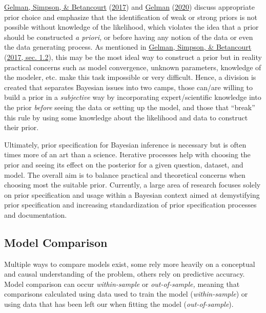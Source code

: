 \documentclass[12pt,twoside]{reedthesis}
\begin{document}
\protect\hyperlink{ref-gelmanPriorCanOften2017}{Gelman, Simpson, \& Betancourt} (\protect\hyperlink{ref-gelmanPriorCanOften2017}{2017}) and \protect\hyperlink{ref-gelmanPriorChoiceRecommendations2020}{Gelman} (\protect\hyperlink{ref-gelmanPriorChoiceRecommendations2020}{2020}) discuss appropriate prior choice and emphasize that the identification of weak or strong priors is not possible without knowledge of the likelihood, which violates the idea that a prior should be constructed \emph{a priori,} or before having any notion of the data or even the data generating process. As mentioned in \protect\hyperlink{ref-gelmanPriorCanOften2017}{Gelman, Simpson, \& Betancourt} (\protect\hyperlink{ref-gelmanPriorCanOften2017}{2017, sec. 1.2}), this may be the most ideal way to construct a prior but in reality practical concerns such as model convergence, unknown parameters, knowledge of the modeler, etc. make this task impossible or very difficult. Hence, a division is created that separates Bayesian issues into two camps, those can/are willing to build a prior in a \emph{subjective} way by incorporating expert/scientific knowledge into the prior \emph{before} seeing the data or setting up the model, and those that ``break'' this rule by using some knowledge about the likelihood and data to construct their prior.

Ultimately, prior specification for Bayesian inference is necessary but is often times more of an art than a science. Iterative processes help with choosing the prior and seeing its effect on the posterior for a given question, dataset, and model. The overall aim is to balance practical and theoretical concerns when choosing most the suitable prior. Currently, a large area of research focuses solely on prior specification and usage within a Bayesian context aimed at demystifying prior specification and increasing standardization of prior specification processes and documentation.

\hypertarget{model-comparison}{%
\subsection{Model Comparison}\label{model-comparison}}

Multiple ways to compare models exist, some rely more heavily on a conceptual and causal understanding of the problem, others rely on predictive accuracy. Model comparison can occur \emph{within-sample} or \emph{out-of-sample,} meaning that comparisons calculated using data used to train the model (\emph{within-sample}) or using data that has been left our when fitting the model (\emph{out-of-sample}).
\end{document}
